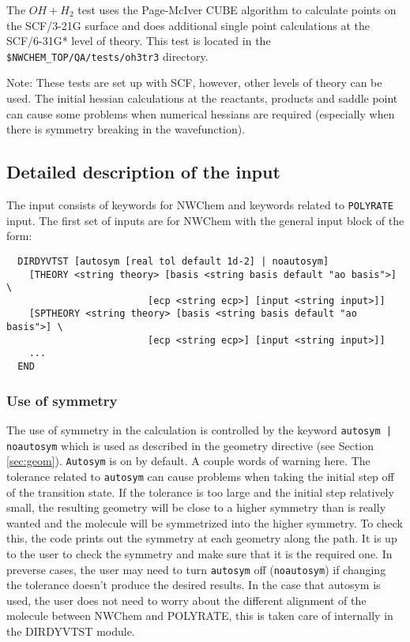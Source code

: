 The $OH + H_2$ test uses the Page-McIver CUBE algorithm to calculate points
on the SCF/3-21G surface and does additional single point calculations at
the SCF/6-31G* level of theory.  This test is located in the
\verb+$NWCHEM_TOP/QA/tests/oh3tr3+ directory.

Note: These tests are set up with SCF, however, other levels of
theory can be used.  The initial hessian calculations at the reactants,
products and saddle point can cause some problems when numerical hessians
are required (especially when there is symmetry breaking in the wavefunction).

\subsection{Detailed description of the input}

The input consists of keywords for NWChem and keywords related to \verb+POLYRATE+
input.  The first set of inputs are for NWChem with the general input block
of the form:

\begin{verbatim}
  DIRDYVTST [autosym [real tol default 1d-2] | noautosym]
    [THEORY <string theory> [basis <string basis default "ao basis">] \
                         [ecp <string ecp>] [input <string input>]]
    [SPTHEORY <string theory> [basis <string basis default "ao basis">] \
                         [ecp <string ecp>] [input <string input>]]
    ...
  END
\end{verbatim}

\subsubsection{Use of symmetry}
The use of symmetry in the calculation is controlled by the keyword
\verb+autosym | noautosym+ which is used as described in the geometry
directive (see Section \ref{sec:geom}).  
\verb+Autosym+ is on by default.  A couple words of warning here.
The tolerance related to \verb+autosym+ can cause problems when taking the
initial step off of the transition state.  If the tolerance is too large and
the initial step relatively small,
the resulting geometry will be close to a higher symmetry than is really 
wanted and the molecule will be symmetrized into the higher symmetry.
To check this, the code prints out the symmetry at each geometry along the 
path.  It is up to the user to check the symmetry and make sure that
it is the required one.  In preverse cases, the user may need to turn
\verb+autosym+ off (\verb+noautosym+) if changing the tolerance doesn't
produce the desired results.  In the case that autosym is used, the
user does not need to worry about the different alignment of the molecule
between NWChem and POLYRATE, this is taken care of internally in the
DIRDYVTST module.

